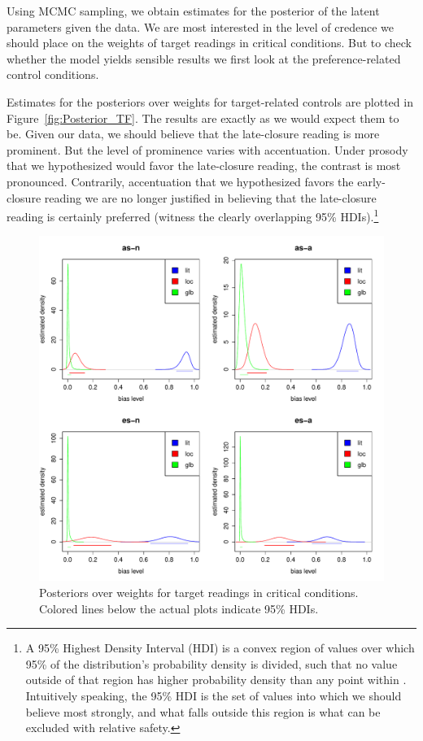 \documentclass[fleqn,reqno,10pt]{article}
\begin{document}
Using MCMC sampling, we obtain estimates for the posterior of the
latent parameters given the data. We are most interested in the level
of credence we should place on the weights of target readings in
critical conditions. But to check whether the model yields sensible
results we first look at the preference-related control
conditions. 

Estimates for the posteriors over weights for target-related controls
are plotted in Figure~\ref{fig:Posterior_TF}. The results are exactly
as we would expect them to be. Given our data, we should believe that
the late-closure reading is more prominent. But the level of
prominence varies with accentuation. Under prosody that we
hypothesized would favor the late-closure reading, the contrast is
most pronounced. Contrarily, accentuation that we hypothesized favors
the early-closure reading we are no longer justified in believing that
the late-closure reading is certainly preferred (witness the clearly
overlapping 95\% HDIs).\footnote{A 95\% Highest Density Interval (HDI)
  is a convex region of values over which 95\% of the distribution's
  probability density is divided, such that no value outside of that
  region has higher probability density than any point within
  \citep{Kruschke2011:Doing-Bayesian-}. Intuitively speaking, the 95\%
  HDI is the set of values into which we should believe most strongly,
  and what falls outside this region is what can be excluded with
  relative safety.}

\begin{figure}
  \centering
  \includegraphics[width=\textwidth]{pics/Posterior_T.pdf}
  \caption{Posteriors over weights for target readings in critical
    conditions. Colored lines below the actual plots indicate 95\%
    HDIs.}
  \label{fig:Posterior_T}
\end{figure}
\end{document}
